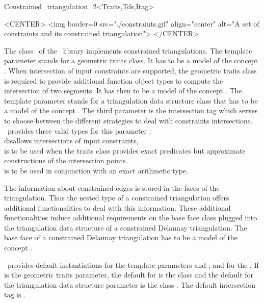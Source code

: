 \begin{ccRefClass}{Constrained_triangulation_2<Traits,Tds,Itag>}
\begin{ccHtmlOnly}
<CENTER>
<img border=0 src="./constraints.gif" align="center" alt="A set of
constraints and its constrained triangulation">
</CENTER>
\end{ccHtmlOnly}

The class \ccRefName\ of the \cgal\ library
implements constrained triangulations.
The template parameter  
stands for a geometric traits class. It has to be a model
of the concept .
When intersection of input constraints are supported, 
the geometric traits class 
is required to provide additional function object  types
to compute the intersection of two segments.
It has then to be a model of the concept
.
The template parameter 
stands for 
a triangulation data structure class that has to be a model
of the concept .
The third parameter  is the intersection tag
which serves  to choose between the different
strategies to deal with constraints intersections. 
\cgal\ provides three valid types for this parameter : \\
 disallows intersections of
 input constraints,\\
 is to be used when the traits
class
provides exact predicates but approximate constructions of the
intersection points.\\
 is to be used in conjunction
with an exact arithmetic type.

 The information about constrained edges is stored in the 
faces of the triangulation. Thus the nested 
type of a constrained triangulation offers
additional functionalities to deal with this information.
These additional functionalities 
induce additional requirements on the base face class
plugged into the triangulation data structure of 
 a constrained Delaunay triangulation.
The base face of a constrained Delaunay triangulation
has to be a model of the concept
.

\cgal\ provides  default instantiations for the template parameters
 and , and for the .
 If  is the geometric traits
parameter,
the default  for
  is the class
and the default for the
triangulation data structure parameter is the class
.
The default intersection tag is .


\end{ccRefClass}
